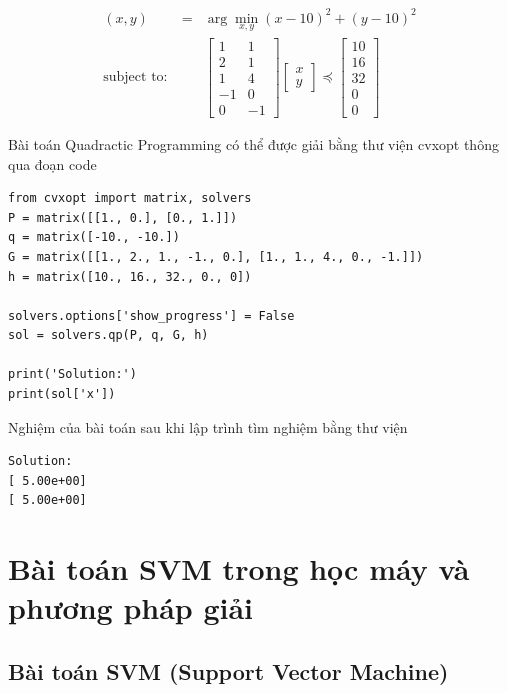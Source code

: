 \documentclass[a4paper, 12pt, oneside]{report}
\begin{document}
\begin{mybox}
\begin{eqnarray}
(x, y) &=& \arg\min_{x, y} (x - 10)^2 + (y - 10)^2 \\
\text{subject to:}~&&
\left[\begin{matrix}
1 & 1 \\
2 & 1 \\
1 & 4 \\
-1 & 0 \\
0 & -1
\end{matrix}\right]
\left[
\begin{matrix}
x \\
y
\end{matrix}
\right]
\preceq
\left[\begin{matrix}
10\\
16 \\
32 \\
0 \\
0
\end{matrix}\right]
\end{eqnarray}
\end{mybox}
Bài toán Quadractic Programming có thể được giải bằng thư viện cvxopt thông qua đoạn code
\begin{lstlisting}
from cvxopt import matrix, solvers
P = matrix([[1., 0.], [0., 1.]])
q = matrix([-10., -10.])
G = matrix([[1., 2., 1., -1., 0.], [1., 1., 4., 0., -1.]])
h = matrix([10., 16., 32., 0., 0])

solvers.options['show_progress'] = False
sol = solvers.qp(P, q, G, h)

print('Solution:')
print(sol['x'])
\end{lstlisting}
Nghiệm của bài toán sau khi lập trình tìm nghiệm bằng thư viện
\begin{lstlisting}
Solution:
[ 5.00e+00]
[ 5.00e+00]
\end{lstlisting}


\chapter{Bài toán SVM trong học máy và phương pháp giải}

\section{Bài toán SVM (Support Vector Machine)} 
\end{document}
